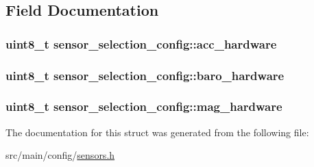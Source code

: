 \subsection{Field Documentation}
\hypertarget{structsensor__selection__config_a454ee9248c86e8f4072b5c595d6c86f4}{
\subsubsection[{acc\+\_\+hardware}]{\setlength{\rightskip}{0pt plus 5cm}uint8\+\_\+t sensor\+\_\+selection\+\_\+config\+::acc\+\_\+hardware}}\label{structsensor__selection__config_a454ee9248c86e8f4072b5c595d6c86f4}
\hypertarget{structsensor__selection__config_acf1cd0f3942afa3ac5420adbfdcb908e}{
\subsubsection[{baro\+\_\+hardware}]{\setlength{\rightskip}{0pt plus 5cm}uint8\+\_\+t sensor\+\_\+selection\+\_\+config\+::baro\+\_\+hardware}}\label{structsensor__selection__config_acf1cd0f3942afa3ac5420adbfdcb908e}
\hypertarget{structsensor__selection__config_ac1fafe3ddd18d7cf451b2335a9f04b8b}{
\subsubsection[{mag\+\_\+hardware}]{\setlength{\rightskip}{0pt plus 5cm}uint8\+\_\+t sensor\+\_\+selection\+\_\+config\+::mag\+\_\+hardware}}\label{structsensor__selection__config_ac1fafe3ddd18d7cf451b2335a9f04b8b}


The documentation for this struct was generated from the following file\+:\begin{DoxyCompactItemize}
\item 
src/main/config/\hyperlink{sensors_8h}{sensors.\+h}\end{DoxyCompactItemize}
